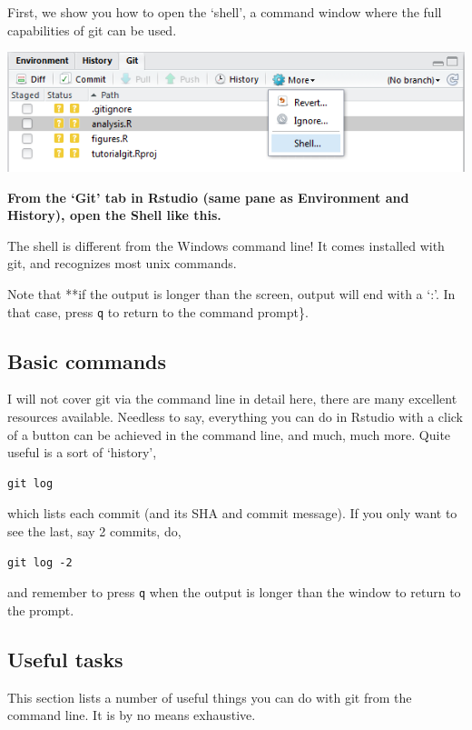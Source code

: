 \documentclass[]{book}
\begin{document}
First, we show you how to open the `shell', a command window where the full capabilities of git can be used.

\includegraphics[width=0.75\linewidth]{screenshots/openshell}

\textbf{From the `Git' tab in Rstudio (same pane as Environment and History), open the Shell like this.}

The shell is different from the Windows command line! It comes installed with git, and recognizes most unix commands.

Note that **if the output is longer than the screen, output will end with a `:'. In that case, press \texttt{q} to return to the command prompt\}.

\hypertarget{basic-commands}{%
\subsection{Basic commands}\label{basic-commands}}

I will not cover git via the command line in detail here, there are many excellent resources available. Needless to say, everything you can do in Rstudio with a click of a button can be achieved in the command line, and much, much more. Quite useful is a sort of `history',

\begin{verbatim}
git log
\end{verbatim}

which lists each commit (and its SHA and commit message). If you only want to see the last, say 2 commits, do,

\begin{verbatim}
git log -2
\end{verbatim}

and remember to press \texttt{q} when the output is longer than the window to return to the prompt.

\hypertarget{useful-tasks}{%
\subsection{Useful tasks}\label{useful-tasks}}

This section lists a number of useful things you can do with git from the command line. It is by no means exhaustive.
\end{document}
